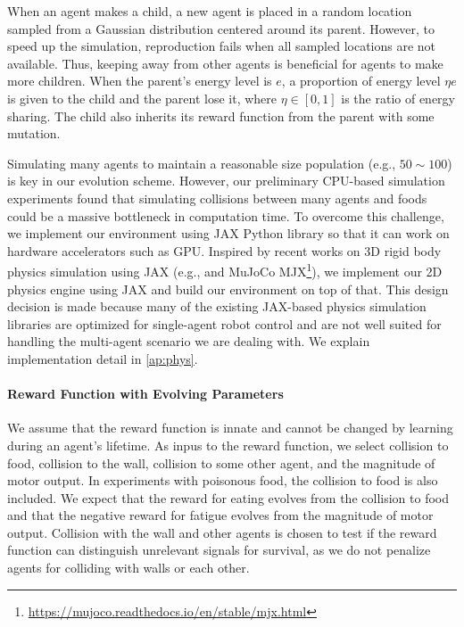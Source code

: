 When an agent makes a child, a new agent is placed in a random location sampled from a Gaussian distribution centered around its parent. However, to speed up the simulation, reproduction fails when all sampled locations are not available. Thus, keeping away from other agents is beneficial for agents to make more children. When the parent's energy level is $e$, a proportion of energy level $\eta e$ is given to the child and the parent lose it, where $\eta \in [0, 1]$ is the ratio of energy sharing. The child also inherits its reward function from the parent with some mutation.

Simulating many agents to maintain a reasonable size population (e.g., $50\sim 100$) is key in our evolution scheme. However, our preliminary CPU-based simulation experiments found that simulating collisions between many agents and foods could be a massive bottleneck in computation time. To overcome this challenge, we implement our environment using JAX Python library \citep{jax2018github} so that it can work on hardware accelerators such as GPU. Inspired by recent works on 3D rigid body physics simulation using JAX (e.g., \citet{brax2021github} and MuJoCo \citep{todorov2012mujoco} MJX\footnote{\url{https://mujoco.readthedocs.io/en/stable/mjx.html}}), we implement our 2D physics engine using JAX and build our environment on top of that. This design decision is made because many of the existing JAX-based physics simulation libraries are optimized for single-agent robot control and are not well suited for handling the multi-agent scenario we are dealing with. We explain implementation detail in \cref{ap:phys}.


\paragraph{Reward Function with Evolving Parameters}
We assume that the reward function is innate and cannot be changed by learning during an agent's lifetime. As inpus to the reward function, we select  collision to food,  collision to the wall,  collision to some other agent, and  the magnitude of motor output. In experiments with poisonous food, the collision to food is also included. We expect that the reward for eating evolves from the collision to food and that the negative reward for fatigue evolves from the magnitude of motor output. Collision with the wall and other agents is chosen to test if the reward function can distinguish unrelevant signals for survival, as we do not penalize agents for colliding with walls or each other.

